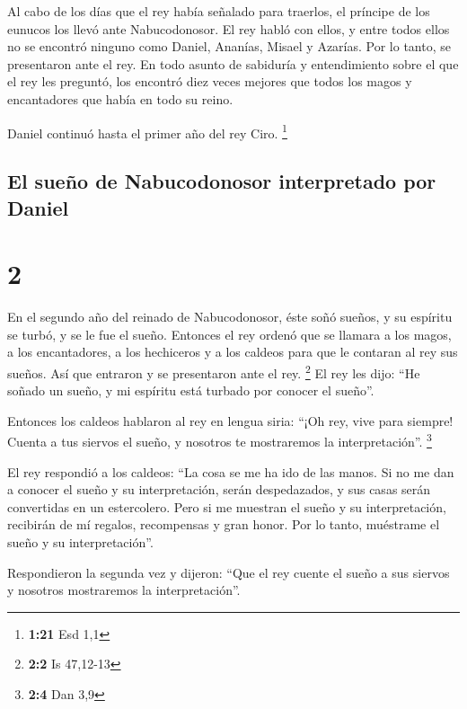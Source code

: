  Al cabo de los días que el rey había señalado para
traerlos, el príncipe de los eunucos los llevó ante Nabucodonosor.
 El rey habló con ellos, y entre todos ellos no se
encontró ninguno como Daniel, Ananías, Misael y Azarías. Por lo tanto,
se presentaron ante el rey.  En todo asunto de sabiduría
y entendimiento sobre el que el rey les preguntó, los encontró diez
veces mejores que todos los magos y encantadores que había en todo su
reino.

 Daniel continuó hasta el primer año del rey Ciro.
\footnote{\textbf{1:21} Esd 1,1}

\hypertarget{el-sueuxf1o-de-nabucodonosor-interpretado-por-daniel}{%
\subsection{El sueño de Nabucodonosor interpretado por
Daniel}\label{el-sueuxf1o-de-nabucodonosor-interpretado-por-daniel}}

\hypertarget{section-1}{%
\section{2}\label{section-1}}

 En el segundo año del reinado de Nabucodonosor, éste soñó
sueños, y su espíritu se turbó, y se le fue el sueño. 
Entonces el rey ordenó que se llamara a los magos, a los encantadores, a
los hechiceros y a los caldeos para que le contaran al rey sus sueños.
Así que entraron y se presentaron ante el rey. \footnote{\textbf{2:2} Is
  47,12-13}  El rey les dijo: ``He soñado un sueño, y mi
espíritu está turbado por conocer el sueño''.

 Entonces los caldeos hablaron al rey en lengua siria:
``¡Oh rey, vive para siempre! Cuenta a tus siervos el sueño, y nosotros
te mostraremos la interpretación''. \footnote{\textbf{2:4} Dan 3,9}

 El rey respondió a los caldeos: ``La cosa se me ha ido de
las manos. Si no me dan a conocer el sueño y su interpretación, serán
despedazados, y sus casas serán convertidas en un estercolero.
 Pero si me muestran el sueño y su interpretación,
recibirán de mí regalos, recompensas y gran honor. Por lo tanto,
muéstrame el sueño y su interpretación''.

 Respondieron la segunda vez y dijeron: ``Que el rey
cuente el sueño a sus siervos y nosotros mostraremos la
interpretación''.

